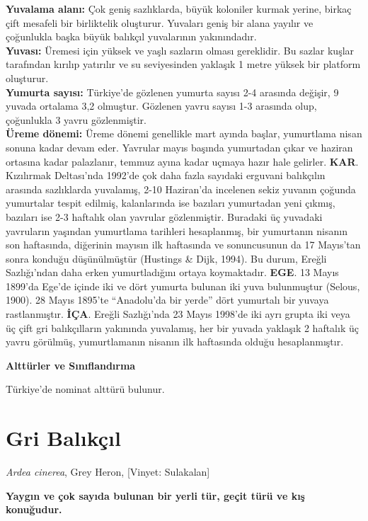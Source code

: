\documentclass[
  a4paper,
  DIV=11,
  numbers=noendperiod]{scrreprt}
\begin{document}
\textbf{Yuvalama alanı:} Çok geniş sazlıklarda, büyük koloniler kurmak
yerine, birkaç çift mesafeli bir birliktelik oluşturur. Yuvaları geniş
bir alana yayılır ve çoğunlukla başka büyük balıkçıl yuvalarının
yakınındadır.\\
\textbf{Yuvası:} Üremesi için yüksek ve yaşlı sazların olması
gereklidir. Bu sazlar kuşlar tarafından kırılıp yatırılır ve su
seviyesinden yaklaşık 1 metre yüksek bir platform oluşturur.\\
\textbf{Yumurta sayısı:} Türkiye'de gözlenen yumurta sayısı 2-4 arasında
değişir, 9 yuvada ortalama 3,2 olmuştur. Gözlenen yavru sayısı 1-3
arasında olup, çoğunlukla 3 yavru gözlenmiştir.\\
\textbf{Üreme dönemi:} Üreme dönemi genellikle mart ayında başlar,
yumurtlama nisan sonuna kadar devam eder. Yavrular mayıs başında
yumurtadan çıkar ve haziran ortasına kadar palazlanır, temmuz ayına
kadar uçmaya hazır hale gelirler. \textbf{KAR}. Kızılırmak Deltası'nda
1992'de çok daha fazla sayıdaki erguvani balıkçılın arasında sazlıklarda
yuvalamış, 2-10 Haziran'da incelenen sekiz yuvanın çoğunda yumurtalar
tespit edilmiş, kalanlarında ise bazıları yumurtadan yeni çıkmış,
bazıları ise 2-3 haftalık olan yavrular gözlenmiştir. Buradaki üç
yuvadaki yavruların yaşından yumurtlama tarihleri hesaplanmış, bir
yumurtanın nisanın son haftasında, diğerinin mayısın ilk haftasında ve
sonuncusunun da 17 Mayıs'tan sonra konduğu düşünülmüştür (Hustings \&
Dijk, 1994). Bu durum, Ereğli Sazlığı'ndan daha erken yumurtladığını
ortaya koymaktadır. \textbf{EGE}. 13 Mayıs 1899'da Ege'de içinde iki ve
dört yumurta bulunan iki yuva bulunmuştur (Selous, 1900). 28 Mayıs
1895'te ``Anadolu'da bir yerde'' dört yumurtalı bir yuvaya
rastlanmıştır. \textbf{İÇA}. Ereğli Sazlığı'nda 23 Mayıs 1998'de iki
ayrı grupta iki veya üç çift gri balıkçılların yakınında yuvalamış, her
bir yuvada yaklaşık 2 haftalık üç yavru görülmüş, yumurtlamanın nisanın
ilk haftasında olduğu hesaplanmıştır.

\textbf{Alttürler ve Sınıflandırma}

Türkiye'de nominat alttürü bulunur.

\section{Gri Balıkçıl}\label{gri-balux131kuxe7ux131l}

\emph{Ardea cinerea}, Grey Heron, {[}Vinyet: Sulakalan{]}

\textbf{Yaygın ve çok sayıda bulunan bir yerli tür, geçit türü ve kış
konuğudur.}
\end{document}
